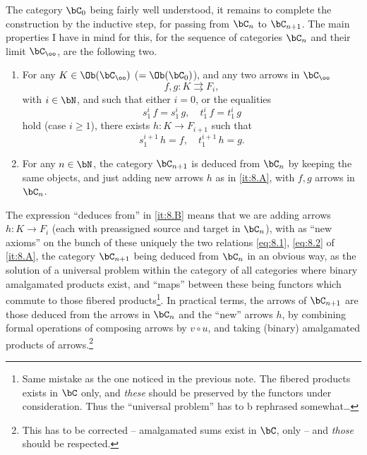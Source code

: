 \label{sec:9}%
The category $\bC_0$ being fairly well understood, it remains to
complete the construction by the inductive step, for passing from $\bC_n$
to $\bC_{n+1}$. The main properties I have in mind for this, for the
sequence of categories $\bC_n$ and their limit $\bC_\oo$, are the
following two.
\begin{enumerate}[label=(\Alph*)]
\item\label{it:8.A} For any $K\in\Ob(\bC_\oo)$ ($=\Ob(\bC_0)$), and any two
  arrows in $\bC_\oo$
  \[ f,g : K \rightrightarrows F_i,\]
  with $i\in\bN$, and such that either $i=0$, or the equalities
  \begin{equation}\label{eq:8.1}
    s_1^i\, f = s_1^i\, g , \quad
    t_1^i\, f = t_1^i\, g\tag{1}
  \end{equation}
  hold (case $i\ge1$), there exists $h : K \to F_{i+1}$ such that
  \begin{equation}\label{eq:8.2}
    s_1^{i+1}\, h = f, \quad
    t_1^{i+1}\, h = g.\tag{2}
  \end{equation}
\item\label{it:8.B}
  For any $n\in\bN$, the category $\bC_{n+1}$ is deduced from $\bC_n$
  by keeping the same objects, and just adding new arrows $h$ as
  in \ref{it:8.A}, with $f,g$ arrows in $\bC_n$.
\end{enumerate}
The expression ``deduces from'' in \ref{it:8.B} means that we are
adding arrows $h: K\to F_i$ (each with preassigned source and target
in $\bC_n$), with as ``new axioms'' on the bunch of these uniquely
the two relations \eqref{eq:8.1}, \eqref{eq:8.2} of \ref{it:8.A}, the category $\bC_{n+1}$
being deduced from $\bC_n$ in an obvious way, as the solution of a
universal problem within the category of all categories where binary
amalgamated products exist, and ``maps'' between these being functors
which commute to those fibered products\footnote{Same mistake as the one noticed in the previous note. The fibered products exists in $\bC$ only, and \emph{these} should be preserved by the functors under consideration. Thus the ``universal problem'' has to b rephrased somewhat\dots}. In practical terms, the
arrows of $\bC_{n+1}$ are those deduced from the arrows in $\bC_n$ and
the ``new'' arrows $h$, by combining formal operations of
composing arrows by $v \circ u$, and taking (binary) amalgamated
products of arrows.\footnote{This has to be corrected -- amalgamated
  sums exist in $\bC$, only -- and \emph{those} should be
  respected.}

